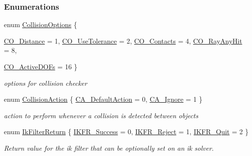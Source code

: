 \subsubsection*{Enumerations}
\begin{DoxyCompactItemize}
\item 
enum \hyperlink{namespaceOpenRAVE_a6963e4ecb981351b8fb2e3f9e85acf77}{CollisionOptions} \{ \par
\hyperlink{namespaceOpenRAVE_a6963e4ecb981351b8fb2e3f9e85acf77aa5d8d85bd05b340ada98305788f161d4}{CO\_\-Distance} =  1, 
\hyperlink{namespaceOpenRAVE_a6963e4ecb981351b8fb2e3f9e85acf77add08e96e785c0ad01b5687ffc50a095d}{CO\_\-UseTolerance} =  2, 
\hyperlink{namespaceOpenRAVE_a6963e4ecb981351b8fb2e3f9e85acf77a9bc2191e9e7b6bfc5fa1807812c45c6c}{CO\_\-Contacts} =  4, 
\hyperlink{namespaceOpenRAVE_a6963e4ecb981351b8fb2e3f9e85acf77a7572c8fd23c74ad1aa04e18eb36808b6}{CO\_\-RayAnyHit} =  8, 
\par
\hyperlink{namespaceOpenRAVE_a6963e4ecb981351b8fb2e3f9e85acf77a95a75683a1fcadcd3de27e6465d74552}{CO\_\-ActiveDOFs} =  16
 \}
\begin{DoxyCompactList}\small\item\em options for collision checker \item\end{DoxyCompactList}\item 
enum \hyperlink{namespaceOpenRAVE_aec38ff628d76ac03cb4ac5d8f5cf3664}{CollisionAction} \{ \hyperlink{namespaceOpenRAVE_aec38ff628d76ac03cb4ac5d8f5cf3664a513d78b13cab5e6407e97b8210ae20ca}{CA\_\-DefaultAction} =  0, 
\hyperlink{namespaceOpenRAVE_aec38ff628d76ac03cb4ac5d8f5cf3664a0ff1e9bcfdd50e768f778a18183da252}{CA\_\-Ignore} =  1
 \}
\begin{DoxyCompactList}\small\item\em action to perform whenever a collision is detected between objects \item\end{DoxyCompactList}\item 
enum \hyperlink{namespaceOpenRAVE_a7a8cf38163621e225d83b4b3a8ff62e9}{IkFilterReturn} \{ \hyperlink{namespaceOpenRAVE_a7a8cf38163621e225d83b4b3a8ff62e9a7a0f5642b1a33ef86868e24bb1e2ea39}{IKFR\_\-Success} =  0, 
\hyperlink{namespaceOpenRAVE_a7a8cf38163621e225d83b4b3a8ff62e9ae0a9b98b94852a81354da20c4c388929}{IKFR\_\-Reject} =  1, 
\hyperlink{namespaceOpenRAVE_a7a8cf38163621e225d83b4b3a8ff62e9a818a27efa66560252c93cc569caae79e}{IKFR\_\-Quit} =  2
 \}
\begin{DoxyCompactList}\small\item\em Return value for the ik filter that can be optionally set on an ik solver. \item\end{DoxyCompactList}\item 

\end{DoxyCompactItemize}
